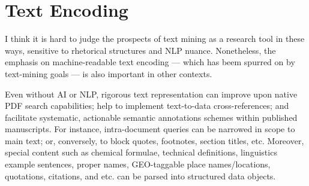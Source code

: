 
\section{Text Encoding}\fbeg{}\begin{frame}{}

\hspace{5pt}\begin{ftxt}[.91\textwidth]

I think it is hard to judge the prospects of text mining as a 
research tool in these ways, sensitive to rhetorical 
structures and NLP nuance.  Nonetheless, the emphasis 
on machine-readable text encoding --- which has beem spurred on 
by text-mining goals --- is also important in other contexts.\\\vspace{-13pt}

Even without AI or NLP, rigorous text representation can 
improve upon native PDF search capabilities; 
help to implement text-to-data cross-references; 
and facilitate systematic, actionable semantic 
annotations schemes within published manuscripts.  
For instance, intra-document queries can be 
narrowed in scope to main text; or, conversely, 
to block quotes, footnotes, section titles, etc.  
Moreover, special content such as chemical 
formulae, technical definitions, linguistics 
example sentences, proper names, GEO-taggable 
place names/locations, quotations, citations, 
and etc. can be parsed into structured data objects. 

\end{ftxt}

\end{frame}

